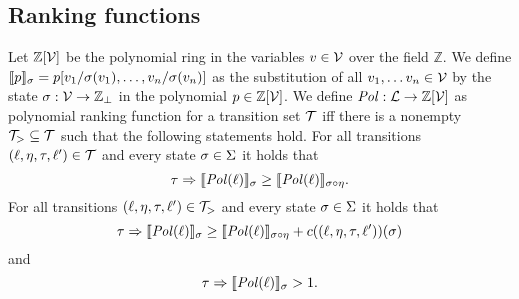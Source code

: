 \subsection{Ranking functions}

\begin{definition} 
	Let $\mathbb{Z}[\mathcal{V}]$ be the polynomial ring in the variables $v \in \mathcal{V}$ over the field $\mathbb{Z}$.
	We define $\llbracket p \rrbracket_{\sigma} = p[v_1/\sigma(v_1), \dots, v_n/\sigma(v_n)]$ as the substitution of all $v_1, \dots v_n \in \mathcal{V}$ by the state $\sigma: \mathcal{V} \rightarrow \mathbb{Z}_\bot$ in the polynomial $p \in \mathbb{Z}[\mathcal{V}]$.
	We define $\mathit{Pol}: \mathcal{L} \rightarrow \mathbb{Z}[\mathcal{V}]$ as polynomial ranking function for a transition set $\mathcal{T}$ iff there is a nonempty $\mathcal{T}_{>} \subseteq \mathcal{T}$ such that the following statements hold.
        For all transitions $(\ell, \eta, \tau, \ell') \in \mathcal{T}$ and every state $\sigma \in \Sigma$ it holds that
	\[ \tau \Rightarrow \llbracket \mathit{Pol}(\ell) \rrbracket_{\sigma} \geq \llbracket \mathit{Pol}(\ell) \rrbracket_{\sigma \circ \eta}. \]
        For all transitions $(\ell, \eta, \tau, \ell') \in \mathcal{T}_{>}$ and every state $\sigma \in \Sigma$ it holds that        
	\[ \tau \Rightarrow \llbracket \mathit{Pol}(\ell) \rrbracket_{\sigma} \geq \llbracket \mathit{Pol}(\ell) \rrbracket_{\sigma \circ \eta} + c((\ell, \eta, \tau, \ell'))(\sigma) \]
        and
	\[ \tau \Rightarrow \llbracket \mathit{Pol}(\ell) \rrbracket_{\sigma} > 1. \]
\end{definition}
